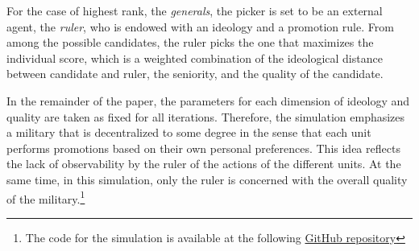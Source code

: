 For the case of highest rank, the \emph{generals}, the picker is set to be an
external agent, the \emph{ruler}, who is endowed with an ideology and a
promotion rule. From among the possible candidates, the ruler picks the one that
maximizes the individual score, which is a weighted combination of the
ideological distance between candidate and ruler, the seniority, and the quality
of the candidate.

In the remainder of the paper, the parameters for each dimension of ideology and
quality are taken as fixed for all iterations. Therefore, the simulation
emphasizes a military that is decentralized to some degree in the sense that
each unit performs promotions based on their own personal preferences. This idea
reflects the lack of observability by the ruler of the actions of the different
units. At the same time, in this simulation, only the ruler is concerned with
the overall quality of the military.\footnote{The code for the simulation is
  available at the following
  \href{https://griverorz@github.org/griverorz/promotions}{GitHub repository}}


